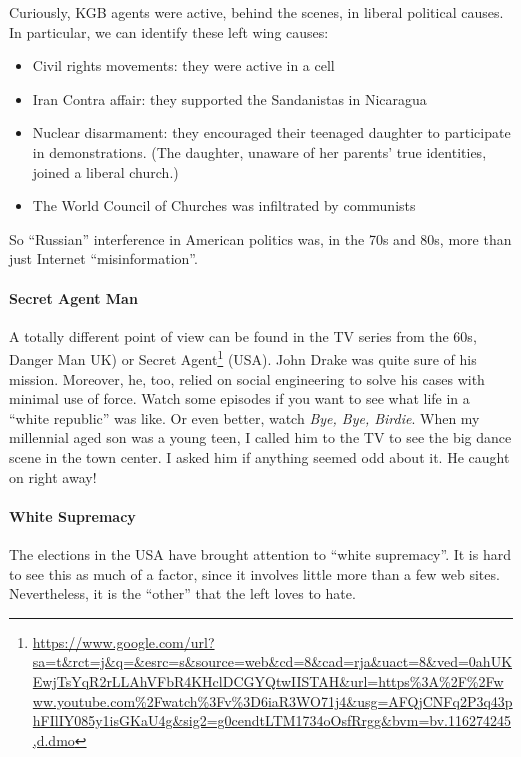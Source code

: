 Curiously, KGB agents were active, behind the scenes, in liberal political causes. In particular, we can identify these left wing causes:

\begin{itemize}


\item Civil rights movements: they were active in a cell

\item Iran Contra affair: they supported the Sandanistas in Nicaragua

\item Nuclear disarmament: they encouraged their teenaged daughter to participate in demonstrations. (The daughter, unaware of her parents' true identities, joined a liberal church.)

\item The World Council of Churches was infiltrated by communists
\end{itemize}


So ``Russian'' interference in American politics was, in the 70s and 80s, more than just Internet ``misinformation''.

\paragraph{Secret Agent Man}


A totally different point of view can be found in the TV series from the 60s, Danger Man UK) or Secret Agent\footnote{\url{https://www.google.com/url?sa=t\&rct=j\&q=\&esrc=s\&source=web\&cd=8\&cad=rja\&uact=8\&ved=0ahUKEwjTsYqR2rLLAhVFbR4KHclDCGYQtwIISTAH\&url=https\%3A\%2F\%2Fwww.youtube.com\%2Fwatch\%3Fv\%3D6iaR3WO71j4\&usg=AFQjCNFq2P3q43phFIlIY085y1isGKaU4g\&sig2=g0cendtLTM1734oOsfRrgg\&bvm=bv.116274245,d.dmo}} (USA). John Drake was quite sure of his mission. Moreover, he, too, relied on social engineering to solve his cases with minimal use of force. Watch some episodes if you want to see what life in a ``white republic'' was like. Or even better, watch \emph{Bye, Bye, Birdie}. When my millennial aged son was a young teen, I called him to the TV to see the big dance scene in the town center. I asked him if anything seemed odd about it. He caught on right away!

\paragraph{White Supremacy}


The elections in the USA have brought attention to ``white supremacy''. It is hard to see this as much of a factor, since it involves little more than a few web sites. Nevertheless, it is the ``other'' that the left loves to hate.

